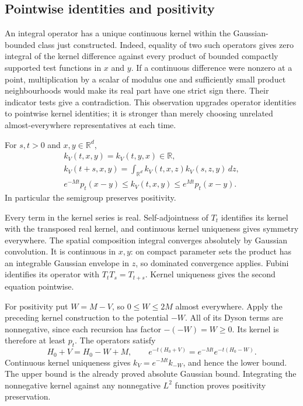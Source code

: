 \subsection{Pointwise identities and positivity}
An integral operator has a unique continuous kernel within the
Gaussian-bounded class just constructed. Indeed, equality of two such
operators gives zero integral of the kernel difference against every
product of bounded compactly supported test functions in $x$ and $y$.
If a continuous difference were nonzero at a point, multiplication by
a scalar of modulus one and sufficiently small product neighbourhoods
would make its real part have one strict sign there. Their indicator
tests give a contradiction. This observation upgrades operator
identities to pointwise kernel identities; it is stronger than merely
choosing unrelated almost-everywhere representatives at each time.

\begin{proposition}
\label{prop:schrodinger_kernel_identities}
For $s,t>0$ and $x,y\in\mathbb R^d$,
\[
\begin{gathered}
k_V(t,x,y)=k_V(t,y,x)\in\mathbb R,\\
k_V(t+s,x,y)=\int_{\mathbb R^d}
                     k_V(t,x,z)k_V(s,z,y)\,dz,\\
e^{-Mt}p_t(x-y)\leq k_V(t,x,y)\leq e^{Mt}p_t(x-y).
\end{gathered}
\]
In particular the semigroup preserves positivity.
\end{proposition}
\Proof
Every term in the kernel series is real. Self-adjointness of $T_t$
identifies its kernel with the transposed real kernel, and continuous
kernel uniqueness gives symmetry everywhere. The spatial composition
integral converges absolutely by Gaussian convolution. It is continuous
in $x,y$: on compact parameter sets the product has an integrable
Gaussian envelope in $z$, so dominated convergence applies. Fubini
identifies its operator with $T_tT_s=T_{t+s}$. Kernel uniqueness gives
the second equation pointwise.

For positivity put $W=M-V$, so $0\leq W\leq2M$ almost everywhere.
Apply the preceding kernel construction to the potential $-W$.
All of its Dyson terms are nonnegative, since each recursion has
factor $-(-W)=W\geq0$. Its kernel is therefore at least $p_t$.
The operators satisfy
\[
H_0+V=H_0-W+M,\qquad
e^{-t(H_0+V)}=e^{-Mt}e^{-t(H_0-W)}.
\]
Continuous kernel uniqueness gives $k_V=e^{-Mt}k_{-W}$, and hence
the lower bound. The upper bound is the already proved absolute
Gaussian bound. Integrating the nonnegative kernel against any
nonnegative $L^2$ function proves positivity preservation.
\Done

